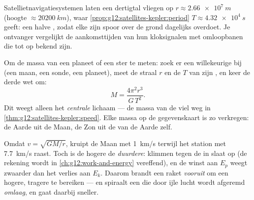 \begin{example}[De navigatiezwerm]\label{ex:g12:satellites-kepler:gps}
Satellietnavigatiesystemen laten een dertigtal  vliegen op
$r \approx \qty{2.66e7}{m}$ (hoogte $\approx \qty{20200}{km}$), waar
\cref{prop:g12:satellites-kepler:period} $T \approx \qty{4.32e4}{s}$ geeft:
een halve , zodat elke  zijn spoor over de grond
dagelijks overdoet. Je ontvanger vergelijkt de aankomsttijden van hun
kloksignalen met omloopbanen die tot op  bekend zijn.
\end{example}

\begin{method}\label{met:g12:satellites-kepler:weigh}
%
Om de massa van een planeet of een ster te meten: zoek er een willekeurige
 bij (een maan, een sonde, een planeet), meet de straal $r$ en de
 $T$ van zijn , en keer de derde wet om:
\[ M = \frac{4\pi^2 r^3}{G\,T^2}. \]
Dit weegt alleen het \emph{centrale} lichaam --- de massa van de 
viel weg in \cref{thm:g12:satellites-kepler:speed}. Elke massa op de
gegevenskaart is zo verkregen: de Aarde uit de Maan, de Zon uit de
 van de Aarde zelf.
\end{method}

\begin{remark}\label{rem:g12:satellites-kepler:energy}
Omdat $v = \sqrt{GM/r}$, kruipt de Maan met \qty{1}{km/s} terwijl het station
met \qty{7.7}{km/s} raast. Toch is de hogere  de \emph{duurdere}:
klimmen tegen de  in slaat  op (de rekening
wordt in \cref{ch:g12:work-and-energy} vereffend), en de winst aan $E_p$
weegt zwaarder dan het verlies aan $E_k$. Daarom brandt een raket
\emph{vooruit} om een hogere, tragere  te bereiken --- en spiraalt
een  die door ijle lucht wordt afgeremd \emph{omlaag}, en gaat
daarbij sneller.
\end{remark}

